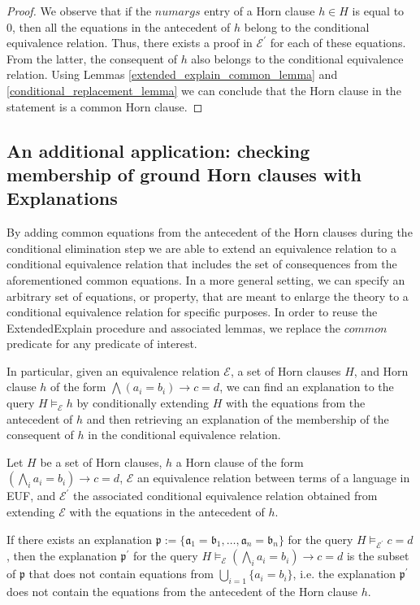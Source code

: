   \begin{proof}
    We observe that if the $numargs$ entry of a Horn clause
    $h \in H$ is equal to 0, then 
    all the equations in the antecedent of $h$ belong 
    to the conditional equivalence relation. Thus, 
    there exists a proof in $\mathcal{E^{'}}$ for
    each of these equations. From the latter, the consequent
    of $h$ also belongs to the conditional equivalence
    relation. Using Lemmas \ref{extended_explain_common_lemma}
    and \ref{conditional_replacement_lemma} we can conclude that
    the Horn clause in the statement is a common Horn clause.
  \end{proof}

  \subsection{An additional application: checking
    membership of ground Horn clauses 
  with Explanations}

  By adding common equations
  from the antecedent of the Horn clauses during the 
  conditional elimination step we are able to 
  extend an equivalence relation to a conditional
  equivalence relation that includes the set 
  of consequences from the aforementioned common equations.
  In a more general setting, we can specify an arbitrary
  set of equations, or property, 
  that are meant to enlarge the theory
  to a conditional equivalence relation for 
  specific purposes. In order to reuse the ExtendedExplain
  procedure and associated lemmas, we replace the $common$
  predicate for any predicate of interest.

  In particular, given an equivalence relation $\mathcal{E}$, a 
  set of Horn clauses $H$, and Horn clause $h$ of the form 
  $\bigwedge (a_i = b_i) \rightarrow c = d$, we can 
  find an explanation to the query $H \models_{\mathcal{E}} h$
  by conditionally extending $H$ with the equations
  from the antecedent of $h$ and then retrieving an explanation
  of the membership of the consequent of $h$ in the conditional 
  equivalence relation.

  \begin{lemma}
    Let $H$ be a set of Horn clauses, $h$ a Horn clause of the
    form $(\bigwedge_i a_i = b_i) \rightarrow c = d$, 
    $\mathcal{E}$ an equivalence relation between terms 
    of a language in EUF, and $\mathcal{E^{'}}$ the associated
    conditional equivalence relation obtained from extending
    $\mathcal{E}$ with the equations in the antecedent of $h$.

    If there exists an explanation 
    $\mathfrak{p} := \{\mathfrak{a}_1 = \mathfrak{b}_1,
    \dots, \mathfrak{a}_n = \mathfrak{b}_n\}$ 
    for the query $H \models_{\mathcal{E^{'}}} c = d$,
    then the explanation $\mathfrak{p^{'}}$ for the query 
    $H \models_{\mathcal{E}} (\bigwedge_i a_i = b_i) 
    \rightarrow c = d$ is the subset of $\mathfrak{p}$
    that does not contain equations from 
    $\bigcup_{i=1}\{a_i = b_i\}$, i.e. the 
    explanation $\mathfrak{p^{'}}$ does not contain 
    the equations from the antecedent of the Horn clause
    $h$.

  \end{lemma}

